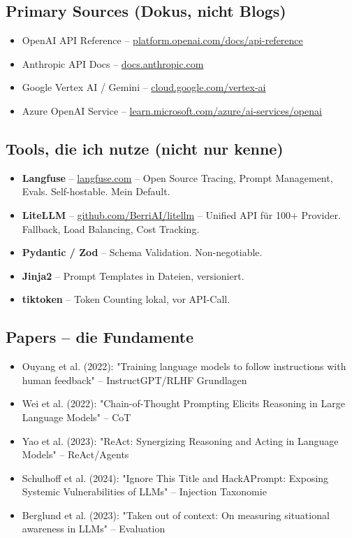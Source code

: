 \subsection{Primary Sources (Dokus, nicht Blogs)}
\begin{itemize}[leftmargin=*]
    \item OpenAI API Reference -- \href{https://platform.openai.com/docs/api-reference}{platform.openai.com/docs/api-reference}
    \item Anthropic API Docs -- \href{https://docs.anthropic.com}{docs.anthropic.com}
    \item Google Vertex AI / Gemini -- \href{https://cloud.google.com/vertex-ai/docs}{cloud.google.com/vertex-ai}
    \item Azure OpenAI Service -- \href{https://learn.microsoft.com/azure/ai-services/openai}{learn.microsoft.com/azure/ai-services/openai}
\end{itemize}

\subsection{Tools, die ich nutze (nicht nur kenne)}
\begin{itemize}[leftmargin=*]
    \item \textbf{Langfuse} -- \href{https://langfuse.com}{langfuse.com} -- Open Source Tracing, Prompt Management, Evals. Self-hostable. Mein Default.
    \item \textbf{LiteLLM} -- \href{https://github.com/BerriAI/litellm}{github.com/BerriAI/litellm} -- Unified API für 100+ Provider. Fallback, Load Balancing, Cost Tracking.
    \item \textbf{Pydantic / Zod} -- Schema Validation. Non-negotiable.
    \item \textbf{Jinja2} -- Prompt Templates in Dateien, versioniert.
    \item \textbf{tiktoken} -- Token Counting lokal, vor API-Call.
\end{itemize}

\subsection{Papers -- die Fundamente}
\begin{itemize}[leftmargin=*]
    \item Ouyang et al. (2022): "Training language models to follow instructions with human feedback" -- InstructGPT/RLHF Grundlagen
    \item Wei et al. (2022): "Chain-of-Thought Prompting Elicits Reasoning in Large Language Models" -- CoT
    \item Yao et al. (2023): "ReAct: Synergizing Reasoning and Acting in Language Models" -- ReAct/Agents
    \item Schulhoff et al. (2024): "Ignore This Title and HackAPrompt: Exposing Systemic Vulnerabilities of LLMs" -- Injection Taxonomie
    \item Berglund et al. (2023): "Taken out of context: On measuring situational awareness in LLMs" -- Evaluation
\end{itemize}




